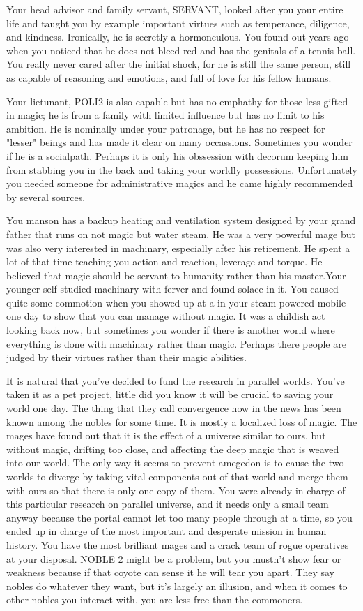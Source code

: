 \documentclass[char]{guildcamp3}
\begin{document}
Your head advisor and family servant, SERVANT, looked after you your entire life and taught you by example important virtues such as temperance, diligence, and kindness. Ironically, he is secretly a hormonculous. You found out years ago when you noticed that he does not bleed red and has the genitals of a tennis ball. You really never cared after the initial shock, for he is still the same person, still as capable of reasoning and emotions, and full of love for his fellow humans.

Your lietunant, POLI2 is also capable but has no emphathy for those less gifted in magic; he is from a family with limited influence but has no limit to his ambition. He is nominally under your patronage, but he has no respect for "lesser" beings and has made it clear on many occassions. Sometimes you wonder if he is a socialpath. Perhaps it is only his obssession with decorum keeping him from stabbing you in the back and taking your worldly possessions. Unfortunately you needed someone for administrative magics and he came highly recommended by several sources. 

You manson has a backup heating and ventilation system designed by your grand father that runs on not magic but water steam. He was a very powerful mage but was also very interested in machinary, especially after his retirement. He spent a lot of that time teaching you action and reaction, leverage and torque. He believed that magic should be servant to humanity rather than his master.Your younger self studied machinary with ferver and found solace in it. You caused quite some commotion when you showed up at a in your steam powered mobile one day to show that you can manage without magic. It was a childish act looking back now, but sometimes you wonder if there is another world where everything is done with machinary rather than magic. Perhaps there people are judged by their virtues rather than their magic abilities.

It is natural that you've decided to fund the research in parallel worlds. You've taken it as a pet project, little did you know it will be crucial to saving your world one day. The thing that they call convergence now in the news has been known among the nobles for some time. It is mostly a localized loss of magic. The mages have found out that it is the effect of a universe similar to ours, but without magic, drifting too close, and affecting the deep magic that is weaved into our world. The only way it seems to prevent amegedon is to cause the two worlds to diverge by taking vital components out of that world and merge them with ours so that there is only one copy of them. You were already in charge of this particular research on parallel universe, and it needs only a small team anyway because the portal cannot let too many people through at a time, so you ended up in charge of the most important and desperate mission in human history. You have the most brilliant mages and a crack team of rogue operatives at your disposal. NOBLE 2 might be a problem, but you mustn't show fear or weakness because if that coyote can sense it he will tear you apart. They say nobles do whatever they want, but it's largely an illusion, and when it comes to other nobles you interact with, you are less free than the commoners.
\end{document}
